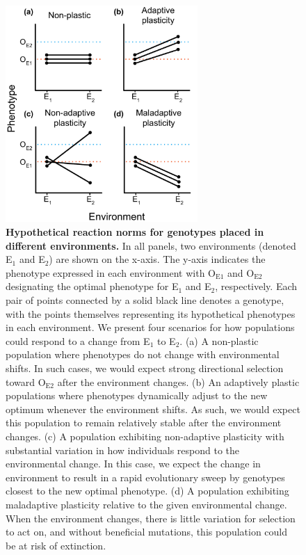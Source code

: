 \begin{figure}[ht!]
    \centering
    \includegraphics[width=0.65\textwidth]{media-reaction-norms.pdf}
    \caption{\small
    \textbf{Hypothetical reaction norms for genotypes placed in different environments.}
    In all panels, two environments (denoted E$_1$ and E$_2$) are shown on the x-axis.
    The y-axis indicates the phenotype expressed in each environment with O$_{\text{E}1}$ and O$_{\text{E}2}$ designating the optimal phenotype for E$_1$ and E$_2$, respectively.
    Each pair of points connected by a solid black line denotes a genotype, with the points themselves representing its hypothetical phenotypes in each environment.
    We present four scenarios for how populations could respond to a change from E$_1$ to E$_2$.
    (a) A non-plastic population where phenotypes do not change with environmental shifts.  In such cases, we would expect strong directional selection toward O$_{\text{E}2}$ after the environment changes.
    (b) An adaptively plastic populations where phenotypes dynamically adjust to the new optimum whenever the environment shifts. As such, we would expect this population to remain relatively stable after the environment changes.
    (c) A population exhibiting non-adaptive plasticity with substantial variation in how individuals respond to the environmental change. In this case, we expect the change in environment to result in a rapid evolutionary sweep by genotypes closest to the new optimal phenotype.
    (d) A population exhibiting maladaptive plasticity relative to the given environmental change. When the environment changes, there is little variation for selection to act on, and without beneficial mutations, this population could be at risk of extinction.
    }
    \label{fig:reaction-norms}
\end{figure}


